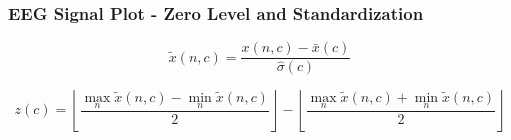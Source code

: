 \documentclass[aspectratio=169]{beamer}
\begin{document}
% 
 
% 
% 
	
	\begin{frame}
	\frametitle{EEG Signal Plot - Zero Level and Standardization}
	\begin{center}

\begin{equation}
\tilde{x}(n,c) =  \frac{ x(n,c) - \bar{x}(c) }{ \hat{\sigma}(c) } 
\label{eq:standarizedaverages}
\end{equation}

\begin{equation}
z(c) = \left \lfloor{ \frac{\max_{n} \tilde{x}(n,c)  - \min_{n} \tilde{x}(n,c) }{2} }\right \rfloor -   \left \lfloor{ \frac{\max_{n} \tilde{x}(n,c)  + \min_{n} \tilde{x}(n,c)}{ 2} }\right \rfloor
\label{eq:zerolevel}
\end{equation}

	\end{center}
	\end{frame}
\end{document}
